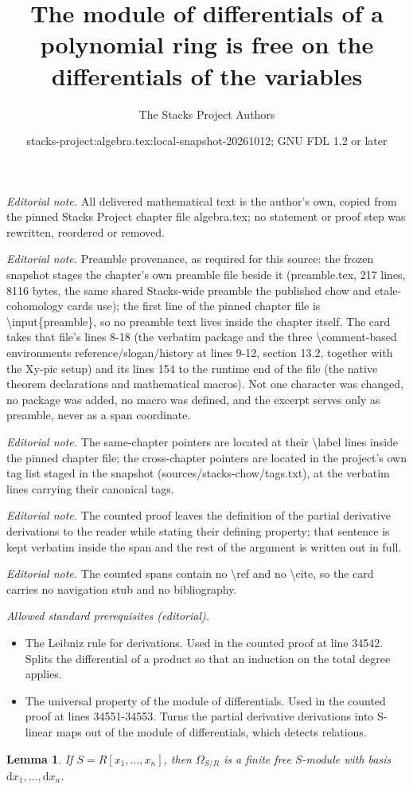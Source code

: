 \documentclass[10pt,a4paper]{amsart}
\title{The module of differentials of a polynomial ring is free on the differentials of the variables}
\author{The Stacks Project Authors}
\date{stacks-project:algebra.tex:local-snapshot-20261012; GNU FDL 1.2 or later}
\theoremstyle{plain}
\newtheorem{lemma}[subsection]{Lemma}
\theoremstyle{definition}
\theoremstyle{remark}
\numberwithin{equation}{subsection}
\begin{document}
\maketitle
\noindent\textit{Editorial note.} All delivered mathematical text is the author's own, copied from the pinned Stacks Project chapter file algebra.tex; no statement or proof step was rewritten, reordered or removed.\par\medskip
\noindent\textit{Editorial note.} Preamble provenance, as required for this source: the frozen snapshot stages the chapter's own preamble file beside it (preamble.tex, 217 lines, 8116 bytes, the same shared Stacks-wide preamble the published chow and etale-cohomology cards use); the first line of the pinned chapter file is \textbackslash{}input\{preamble\}, so no preamble text lives inside the chapter itself. The card takes that file's lines 8-18 (the verbatim package and the three \textbackslash{}comment-based environments reference/slogan/history at lines 9-12, section 13.2, together with the Xy-pic setup) and its lines 154 to the runtime end of the file (the native theorem declarations and mathematical macros). Not one character was changed, no package was added, no macro was defined, and the excerpt serves only as preamble, never as a span coordinate.\par\medskip
\noindent\textit{Editorial note.} The same-chapter pointers are located at their \textbackslash{}label lines inside the pinned chapter file; the cross-chapter pointers are located in the project's own tag list staged in the snapshot (sources/stacks-chow/tags.txt), at the verbatim lines carrying their canonical tags.\par\medskip
\noindent\textit{Editorial note.} The counted proof leaves the definition of the partial derivative derivations to the reader while stating their defining property; that sentence is kept verbatim inside the span and the rest of the argument is written out in full.\par\medskip
\noindent\textit{Editorial note.} The counted spans contain no \textbackslash{}ref and no \textbackslash{}cite, so the card carries no navigation stub and no bibliography.\par\medskip
\noindent\textit{Allowed standard prerequisites (editorial).}\begin{itemize}
\item The Leibniz rule for derivations. Used in the counted proof at line 34542. Splits the differential of a product so that an induction on the total degree applies.
\item The universal property of the module of differentials. Used in the counted proof at lines 34551-34553. Turns the partial derivative derivations into S-linear maps out of the module of differentials, which detects relations.
\end{itemize}\medskip
\begin{lemma}
\label{lemma-differentials-polynomial-ring}
If $S = R[x_1, \ldots, x_n]$, then
$\Omega_{S/R}$ is a finite free $S$-module with
basis $\text{d}x_1, \ldots, \text{d}x_n$.
\end{lemma}
\end{document}
